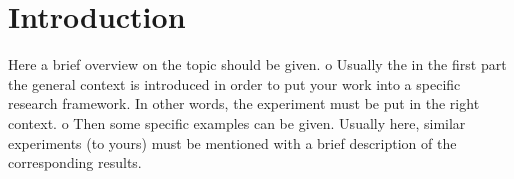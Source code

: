 \chapter{Introduction}
Here a brief overview on the topic should be given.
o Usually the in the first part the general context is introduced in order to put your work
into a specific research framework. In other words, the experiment must be put in the
right context.
o Then some specific examples can be given. Usually here, similar experiments (to yours)
must be mentioned with a brief description of the corresponding results. 